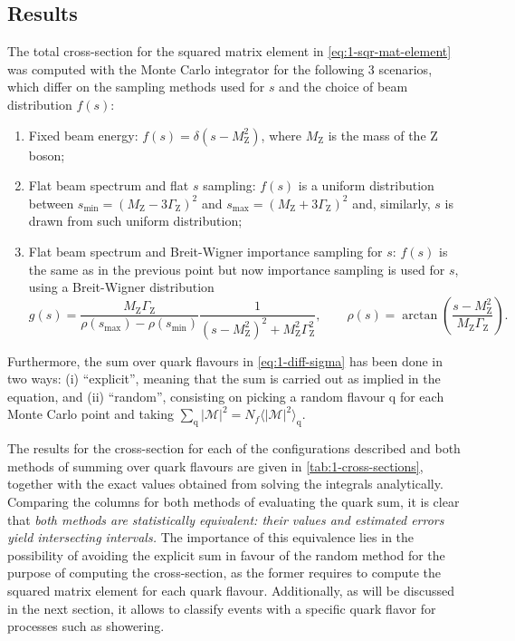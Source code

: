 \newpage

\subsection{Results}

The total cross-section for the squared matrix element in \eqref{eq:1-sqr-mat-element} was computed with the Monte Carlo integrator for the following 3 scenarios, which differ on the sampling methods used for $s$ and the choice of beam distribution $f(s)$:
\begin{enumerate}
    \item Fixed beam energy: $f(s) = \delta(s - M_{\mathrm{Z}}^{2})$, where $M_{\mathrm{Z}}$ is the mass of the Z boson;

    \item Flat beam spectrum and flat $s$ sampling: $f(s)$ is a uniform distribution between $s_{\text{min}} = (M_{\text{Z}} - 3 \Gamma_{\text{Z}})^{2}$ and $s_{\text{max}} = (M_{\text{Z}} + 3 \Gamma_{\text{Z}})^{2}$ and, similarly, $s$ is drawn from such uniform distribution;

    \item Flat beam spectrum and Breit-Wigner importance sampling for $s$: $f(s)$ is the same as in the previous point but now importance sampling is used for $s$, using a Breit-Wigner distribution
    \begin{equation}\label{eq:1-breit-wigner}
        g(s) = \frac{M_{\text{Z}} \Gamma_{\text{Z}}}{\rho(s_{\text{max}}) - \rho(s_{\text{min}})} \frac{1}{(s - M_{\text{Z}}^{2})^{2} + M^{2}_{\text{Z}} \Gamma^{2}_{\text{Z}}}, \qquad \rho(s) = \arctan{ \left( \frac{s - M_{\text{Z}}^{2}}{M_{\text{Z}} \Gamma_{\text{Z}}}\right)}.
    \end{equation}
\end{enumerate}
Furthermore, the sum over quark flavours in \eqref{eq:1-diff-sigma} has been done in two ways: (i) “explicit”, meaning that the sum is carried out as implied in the equation, and (ii) “random”, consisting on picking a random flavour q for each Monte Carlo point and taking $\sum_{\mathrm{q}} \lvert \mathcal{M} \rvert^{2} = N_{f} \langle \lvert \mathcal{M} \rvert^{2} \rangle_{\mathrm{q}}$.

The results for the cross-section for each of the configurations described and both methods of summing over quark flavours are given in \autoref{tab:1-cross-sections}, together with the exact values obtained from solving the integrals analytically. Comparing the columns for both methods of evaluating the quark sum, it is clear that \emph{both methods are statistically equivalent: their values and estimated errors yield intersecting intervals.} The importance of this equivalence lies in the possibility of avoiding the explicit sum in favour of the random method for the purpose of computing the cross-section, as the former requires to compute the squared matrix element for each quark flavour. Additionally, as will be discussed in the next section, it allows to classify events with a specific quark flavor for processes such as showering.


